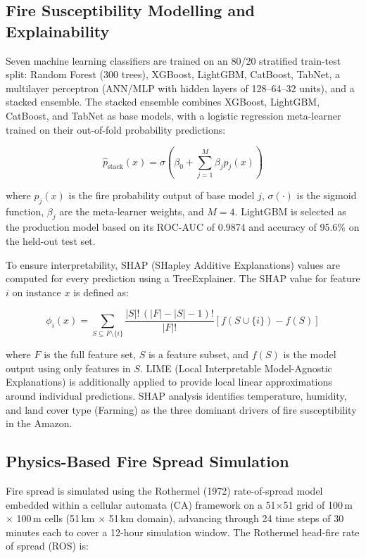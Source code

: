 \documentclass[12pt,a4paper]{article}
\begin{document}
\subsection{Fire Susceptibility Modelling and Explainability}

Seven machine learning classifiers are trained on an 80/20 stratified train-test split: Random Forest (300 trees), XGBoost, LightGBM, CatBoost, TabNet, a multilayer perceptron (ANN/MLP with hidden layers of 128--64--32 units), and a stacked ensemble. The stacked ensemble combines XGBoost, LightGBM, CatBoost, and TabNet as base models, with a logistic regression meta-learner trained on their out-of-fold probability predictions:

\begin{equation}
\hat{p}_{\text{stack}}(x) = \sigma\!\left(\beta_0 + \sum_{j=1}^{M} \beta_j \hat{p}_j(x)\right)
\end{equation}

where $\hat{p}_j(x)$ is the fire probability output of base model $j$, $\sigma(\cdot)$ is the sigmoid function, $\beta_j$ are the meta-learner weights, and $M = 4$. LightGBM is selected as the production model based on its ROC-AUC of 0.9874 and accuracy of 95.6\% on the held-out test set.

To ensure interpretability, SHAP (SHapley Additive Explanations) values are computed for every prediction using a TreeExplainer. The SHAP value for feature $i$ on instance $x$ is defined as:

\begin{equation}
\phi_i(x) = \sum_{S \subseteq F \setminus \{i\}} \frac{|S|!\,(|F|-|S|-1)!}{|F|!} \left[ f(S \cup \{i\}) - f(S) \right]
\end{equation}

where $F$ is the full feature set, $S$ is a feature subset, and $f(S)$ is the model output using only features in $S$. LIME (Local Interpretable Model-Agnostic Explanations) is additionally applied to provide local linear approximations around individual predictions. SHAP analysis identifies temperature, humidity, and land cover type (Farming) as the three dominant drivers of fire susceptibility in the Amazon.

\subsection{Physics-Based Fire Spread Simulation}

Fire spread is simulated using the Rothermel (1972) rate-of-spread model embedded within a cellular automata (CA) framework on a 51$\times$51 grid of 100\,m $\times$ 100\,m cells (51\,km $\times$ 51\,km domain), advancing through 24 time steps of 30 minutes each to cover a 12-hour simulation window. The Rothermel head-fire rate of spread (ROS) is:
\end{document}
